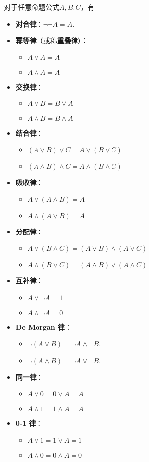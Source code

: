 \begin{theorem}[基本等值式]
对于任意命题公式\(A,B,C\)，有\begin{itemize}
	\item {\rm\bf 对合律}：\(\neg\neg A = A\).
	\item {\rm\bf 幂等律}（或称{\rm\bf 重叠律}）：\begin{itemize}
		\item \(A \lor A = A\)
		\item \(A \land A = A\)
	\end{itemize}
	\item {\rm\bf 交换律}：\begin{itemize}
		\item \(A \lor B = B \lor A\)
		\item \(A \land B = B \land A\)
	\end{itemize}
	\item {\rm\bf 结合律}：\begin{itemize}
		\item \((A \lor B) \lor C = A \lor (B \lor C)\)
		\item \((A \land B) \land C = A \land (B \land C)\)
	\end{itemize}
	\item {\rm\bf 吸收律}：\begin{itemize}
		\item \(A \lor (A \land B) = A\)
		\item \(A \land (A \lor B) = A\)
	\end{itemize}
	\item {\rm\bf 分配律}：\begin{itemize}
		\item \(A \lor (B \land C) = (A \lor B) \land (A \lor C)\)
		\item \(A \land (B \lor C) = (A \land B) \lor (A \land C)\)
	\end{itemize}
	\item {\rm\bf 互补律}：\begin{itemize}
		\item \(A \lor \neg A = 1\)
		\item \(A \land \neg A = 0\)
	\end{itemize}
	\item {\rm\bf De Morgan 律}：\begin{itemize}
		\item \(\neg(A \lor B) = \neg A \land \neg B\).
		\item \(\neg(A \land B) = \neg A \lor \neg B\).
	\end{itemize}
	\item {\rm\bf 同一律}：\begin{itemize}
		\item \(A \lor 0 = 0 \lor A = A\)
		\item \(A \land 1 = 1 \land A = A\)
	\end{itemize}
	\item {\rm\bf 0-1 律}：\begin{itemize}
		\item \(A \lor 1 = 1 \lor A = 1\)
		\item \(A \land 0 = 0 \land A = 0\)
	\end{itemize}
\end{itemize}
\end{theorem}
